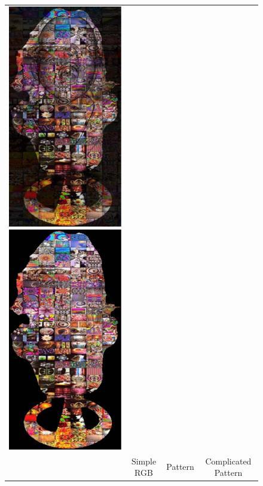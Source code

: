 \begin{figure}[H]
{\begin{tabular}{cccc}
    \includegraphics[height=0.25\linewidth]{figures/result/comp_love_rgb.pdf}
    \includegraphics[height=0.25\linewidth]{figures/result/comp_love_albedo.pdf} \\
     & {\small Simple RGB} & {\small Pattern} & {\small Complicated Pattern } \\
  


\end{tabular}}
\end{figure}
